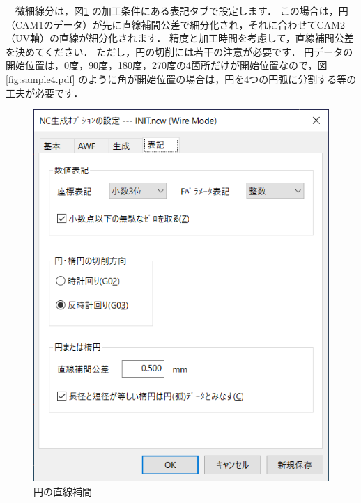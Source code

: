　微細線分は，図\ref{fig:ncw2.png} の加工条件にある表記タブで設定します．
この場合は，円（CAM1のデータ）が先に直線補間公差で細分化され，それに合わせてCAM2（UV軸）の直線が細分化されます．
精度と加工時間を考慮して，直線補間公差を決めてください．
ただし，円の切削には若干の注意が必要です．
円データの開始位置は，0度，90度，180度，270度の4箇所だけが開始位置なので，図\ref{fig:sample4.pdf} のように角が開始位置の場合は，円を4つの円弧に分割する等の工夫が必要です．

\begin{minipage}{0.5\textwidth}
\begin{figure}[H]
\centering
\includegraphics[scale=0.7]{No2/fig/ncw2.png}
\caption{円の直線補間}
\label{fig:ncw2.png}
\end{figure}
\end{minipage}

